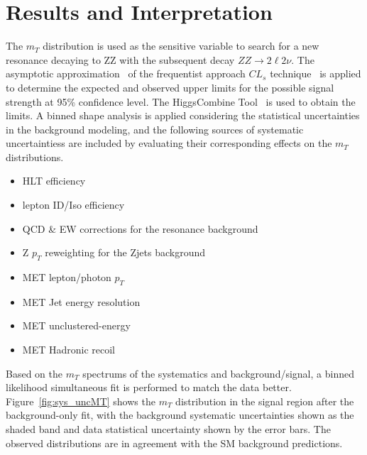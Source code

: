 \section{Results and Interpretation}
The $m_T$ distribution is used as the sensitive variable to search for a new resonance decaying to ZZ with the subsequent decay $ZZ\rightarrow 2\ell 2\nu$. The asymptotic approximation~\cite{sys_cls0} of the frequentist approach $CL_s$ technique~\cite{sys_cls1,sys_cls2,sys_cls3} is applied to determine the expected and observed upper limits for the possible signal strength at 95\% confidence level. The HiggsCombine Tool~\cite{sys_higgscombinetool} is used to obtain the limits. A binned shape analysis is applied considering the statistical uncertainties in the background modeling, and the following sources of systematic uncertaintiess are included by evaluating their corresponding effects on the $m_T$ distributions.
\begin{itemize}
\item HLT efficiency
\item lepton ID/Iso efficiency
\item QCD \& EW corrections for the resonance background
\item Z $p_T$ reweighting for the Zjets background
\item MET lepton/photon $p_T$
\item MET Jet energy resolution
\item MET unclustered-energy
\item MET Hadronic recoil 
\end{itemize}

Based on the $m_T$ spectrums of the systematics and background/signal, a binned likelihood simultaneous fit is performed to match the data better. Figure~\ref{fig:sys_uncMT} shows the $m_T$ distribution in the signal region after the background-only fit, with the background systematic uncertainties shown as the shaded band and data statistical uncertainty shown by the error bars. The observed distributions are in agreement with the SM background predictions.

